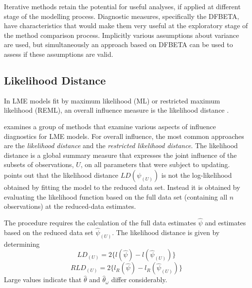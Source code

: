 \documentclass[12pt, a4paper]{report}
\theoremstyle{definition}
\theoremstyle{remark}
\begin{document}
Iterative methods retain the potential for useful analyses, if applied at different stage of the modelling process. Diagnostic measures, specifically the DFBETA, have characteristics that would make them very useful at the exploratory stage of the method comparison process. Implicitly various assumptions about variance are used, but simultaneously an approach based on DFBETA can be used to assess if these assumptions are valid.




\subsection{Likelihood Distance}
In LME models fit by
 maximum likelihood (ML) or  restricted maximum likelihood (REML), an overall influence measure is the  likelihood distance \citep{CookWeisberg}.

\citet{west} examines a group of methods that examine various aspects of influence diagnostics for LME models. For overall influence, the most common approaches are the \textit{likelihood distance} and the \textit{restricted likelihood distance}.
The  likelihood distance is a global summary measure that expresses the joint influence of the subsets of observations, $U$, on all parameters that were subject to updating. \citet{schabenberger} points out that the likelihood distance $LD(\psi_{(U)})$ is not the log-likelihood obtained by fitting the model to the reduced data set. Instead it is obtained by evaluating the likelihood function based on the full data set (containing all $n$ observations) at the reduced-data estimates.





The
procedure requires the calculation of the full data estimates
$\hat{\psi}$ and estimates based on the reduced data set
$\hat{\psi}_{(U)}$. The likelihood distance is given by
determining
\[
LD_{(U)} = 2\{l(\hat{\psi}) - l( \hat{\psi}_{(U)}) \}\]\[
RLD_{(U)} = 2\{l_{R}(\hat{\psi}) - l_{R}(\hat{\psi}_{(U)})\}
\]
Large values indicate that ${\hat{\theta}}$ and ${\hat{\theta}_\omega}$ differ considerably.
\end{document}
